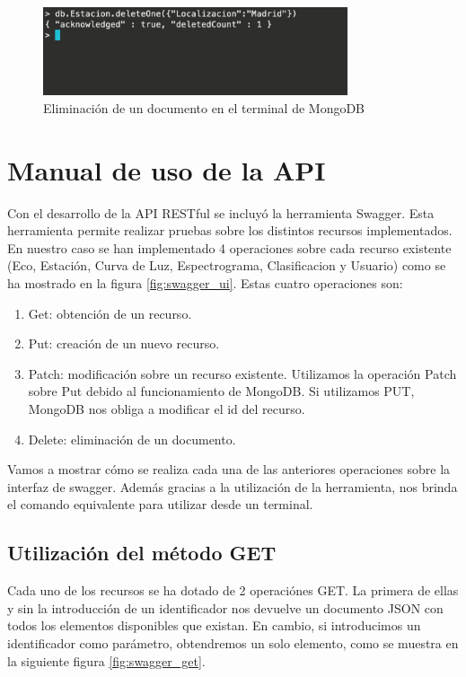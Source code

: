 \begin{figure}[h]
    \centering
    \includegraphics[width=0.8\textwidth]{include/resultados/DeleteMongo.png}
    \caption{Eliminación de un documento en el terminal de MongoDB}
    \label{fig:deleteMongo}
\end{figure}


\section{Manual de uso de la API}

Con el desarrollo de la API RESTful se incluyó la herramienta Swagger. Esta herramienta permite realizar pruebas sobre los distintos recursos implementados. En nuestro caso se han implementado 4 operaciones sobre cada recurso existente (Eco, Estación, Curva de Luz, Espectrograma, Clasificacion y Usuario) como se ha mostrado en la figura \ref{fig:swagger_ui}. Estas cuatro operaciones son:

\begin{enumerate}
    \item Get: obtención de un recurso.
    \item Put: creación de un nuevo recurso.
    \item Patch: modificación sobre un recurso existente. Utilizamos la operación Patch sobre Put debido al funcionamiento de MongoDB. Si utilizamos PUT, MongoDB nos obliga a modificar el id del recurso.
    \item Delete: eliminación de un documento.
\end{enumerate}

Vamos a mostrar cómo se realiza cada una de las anteriores operaciones sobre la interfaz de swagger. Además gracias a la utilización de la herramienta, nos brinda el comando equivalente para utilizar desde un terminal. 

\subsection{Utilización del método GET}

Cada uno de los recursos se ha dotado de 2 operaciónes GET. La primera de ellas y sin la introducción de un identificador nos devuelve un documento JSON con todos los elementos disponibles que existan. En cambio, si introducimos un identificador como parámetro, obtendremos un solo elemento, como se muestra en la siguiente figura \ref{fig:swagger_get}. 

